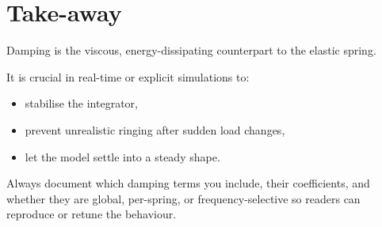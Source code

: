 \documentclass{article}
\begin{document}
\hrulefill
\section{Take-away}

Damping is the viscous, energy-dissipating counterpart to the elastic spring.

It is crucial in real-time or explicit simulations to:
\begin{itemize}
    \item stabilise the integrator,
    \item prevent unrealistic ringing after sudden load changes,
    \item let the model settle into a steady shape.
\end{itemize}
Always document which damping terms you include, their coefficients, and whether they are global, per-spring, or frequency-selective so readers can reproduce or retune the behaviour.
\end{document}
